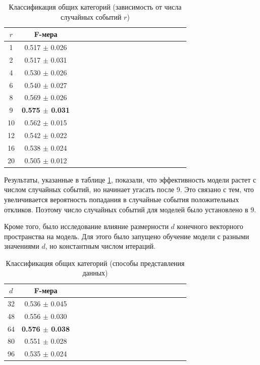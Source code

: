 \documentclass[times,specification,annotation]{itmo-student-thesis}
\begin{document}
\begin{table}[!h]
\caption{Классификация общих категорий (зависимость от числа случайных событий $r$)}\label{tab-cmp-r}
\centering
\begin{tabular}{|*{18}{c|}}\hline
$r$ &  F-мера   \\\hline
1 &  0.517 $\pm$ 0.026\\\hline
2 &  0.517 $\pm$ 0.031 \\\hline
4 &  0.530 $\pm$ 0.026 \\\hline
6 &  0.540 $\pm$ 0.027 \\\hline
8 &  0.569 $\pm$ 0.026 \\\hline
9 &  \textbf{0.575 $\pm$ 0.031} \\\hline
10 &  0.562 $\pm$ 0.015 \\\hline
12 &  0.542 $\pm$ 0.022 \\\hline
16 &  0.538 $\pm$ 0.024 \\\hline
20 &  0.505 $\pm$ 0.012 \\\hline
\end{tabular}
\end{table}

Результаты, указанные в таблице \ref{tab-cmp-r}, показали, что эффективность модели растет с числом случайных событий, но начинает угасать после 9. Это связано с тем, что увеличивается вероятность попадания в случайные события положительных откликов. Поэтому число случайных событий для моделей было установлено в 9.

Кроме того, было исследование влияние размерности $d$ конечного векторного пространства на модель. Для этого было запущено обучение модели с разными значениями $d$, но константным числом итераций.  

\begin{table}[!h]
\caption{Классификация общих категорий (способы представления данных)}\label{tab-cmp-embd}
\centering
\begin{tabular}{|*{18}{c|}}\hline
$d$ &  F-мера   \\\hline
32 & 0.536 $\pm$ 0.045 \\\hline
48 & 0.556 $\pm$ 0.030 \\\hline
64 & \textbf{0.576 $\pm$ 0.038} \\\hline
80 & 0.551 $\pm$ 0.028 \\\hline
96 & 0.535 $\pm$ 0.024 \\\hline
\end{tabular}
\end{table}
\end{document}
